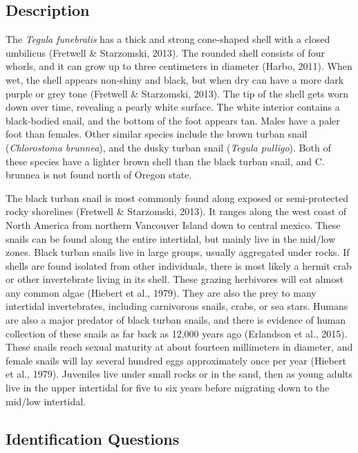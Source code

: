 \documentclass[
]{article}
\begin{document}
\hypertarget{description-2}{%
\subsection{Description}\label{description-2}}

The \emph{Tegula funebralis} has a thick and strong cone-shaped shell
with a closed umbilicus (Fretwell \& Starzomski, 2013). The rounded
shell consists of four whorls, and it can grow up to three centimeters
in diameter (Harbo, 2011). When wet, the shell appears non-shiny and
black, but when dry can have a more dark purple or grey tone (Fretwell
\& Starzomski, 2013). The tip of the shell gets worn down over time,
revealing a pearly white surface. The white interior contains a
black-bodied snail, and the bottom of the foot appears tan. Males have a
paler foot than females. Other similar species include the brown turban
snail (\emph{Chlorostoma brunnea}), and the dusky turban snail
(\emph{Tegula pulligo}). Both of these species have a lighter brown
shell than the black turban snail, and C. brunnea is not found north of
Oregon state.

The black turban snail is most commonly found along exposed or
semi-protected rocky shorelines (Fretwell \& Starzomski, 2013). It
ranges along the west coast of North America from northern Vancouver
Island down to central mexico. These snails can be found along the
entire intertidal, but mainly live in the mid/low zones. Black turban
snails live in large groups, usually aggregated under rocks. If shells
are found isolated from other individuals, there is most likely a hermit
crab or other invertebrate living in its shell. These grazing herbivores
will eat almost any common algae (Hiebert et al., 1979). They are also
the prey to many intertidal invertebrates, including carnivorous snails,
crabs, or sea stars. Humans are also a major predator of black turban
snails, and there is evidence of human collection of these snails as far
back as 12,000 years ago (Erlandson et al., 2015). These snails reach
sexual maturity at about fourteen millimeters in diameter, and female
snails will lay several hundred eggs approximately once per year
(Hiebert et al., 1979). Juveniles live under small rocks or in the sand,
then as young adults live in the upper intertidal for five to six years
before migrating down to the mid/low intertidal.

\hypertarget{identification-questions-1}{%
\subsection{Identification Questions}\label{identification-questions-1}}
\end{document}
